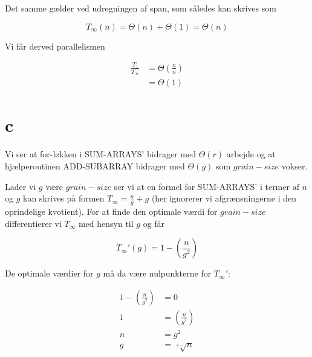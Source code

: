 \documentclass[10pt,a4paper,danish]{article}
\begin{document}
Det samme gælder ved udregningen af span, som således kan skrives som 

$$T_\infty(n) = \Theta(n) + \Theta(1) = \Theta(n)$$

Vi får derved parallelismen

$$
\begin{aligned}
\frac{T_1} {T_\infty} &= \Theta(\frac{n} {n})\\
&= \Theta(1)
\end{aligned}
$$

\section{c}
Vi ser at for-løkken i SUM-ARRAYS' bidrager med $\Theta(r)$ arbejde og 
at hjælperoutinen ADD-SUBARRAY bidrager med $\Theta(g)$ som $grain-size$ vokser. 

Lader vi $g$ være $grain-size$ ser vi at en formel for SUM-ARRAYS' i termer af $n$ og $g$
kan skrives på formen $T_\infty = \frac{n} {g} + g$ (her ignorerer vi afgrænsningerne i den 
oprindelige kvotient). For at finde den optimale værdi for $grain-size$ differentierer vi
$T_\infty$ med hensyn til $g$ og får

$$T_\infty'(g) = 1 - (\frac{n} {g^2}) $$

De optimale værdier for $g$ må da være nulpunkterne for $T_\infty'$: 

$$
\begin{aligned}
 1 - (\frac{n} {g^2}) &= 0 \\
 1 &=  (\frac{n} {g^2}) \\
 n &= g^2 \\
 g &= \sqrt[+-]{n}
\end{aligned}
$$
 
\end{document}

